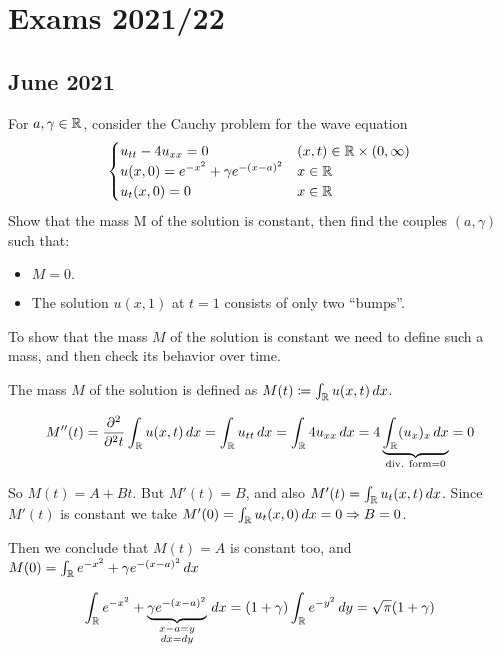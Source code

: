 \section{Exams 2021/22}
\subsection{June 2021}
\begin{exercise}
    For \(a, \gamma \in \mathbb{R}\), consider the Cauchy problem for the wave equation
    \begin{equation*}
        \begin{cases}
            u_{tt} - 4u_{xx} = 0 & (x,t) \in \mathbb{R} \times (0, \infty) \\
            u(x, 0) = e^{-x^2} + \gamma e^{-(x-a)^2} & x \in \mathbb{R} \\
            u_t(x, 0) = 0 & x \in \mathbb{R}
        \end{cases}
    \end{equation*}
    Show that the mass M of the solution is constant, then find the couples \((a, \gamma)\) such that:
    \begin{itemize}
        \item \(M = 0.\)
        \item The solution \(u(x,1)\) at \(t=1\) consists of only two ``bumps''.
    \end{itemize}
\end{exercise}

To show that the mass \(M\) of the solution is constant we need to define such a mass, and then check its behavior over time.


The mass \(M\) of the solution is defined as \(M(t) \coloneqq \int_{\mathbb{R}} u(x,t) \, dx\).

\[M''(t) = \frac{\partial^2}{\partial^2 t} \int_{\mathbb{R}} u(x,t) \, dx = \int_{\mathbb{R}} u_{tt} \, dx = \int_{\mathbb{R}} 4 u_{xx}\, dx = 4 \underbrace{\int_{\mathbb{R}} (u_x)_x\, dx}_{\text{div. form} = 0} = 0\]

So \(M(t) = A + Bt\). But \(M'(t) = B\), and also \(M'(t) = \int_{\mathbb{R}} u_t(x,t)\, dx\). Since \(M'(t)\) is constant we take \(M'(0) = \int_{\mathbb{R}} u_t(x,0)\, dx = 0 \Rightarrow B = 0\).

Then we conclude that \(M(t) = A\) is constant too, and \(M(0) = \int_{\mathbb{R}} e^{-x^2} + \gamma e^{-(x-a)^2} \, dx\)

\[
    \int_{\mathbb{R}} e^{-x^2} + \underbrace{\gamma e^{-(x-a)^2}}_{\substack{x-a=y \\ dx = dy}} \, dx = (1+ \gamma) \int_{\mathbb{R}} e^{-y^2} \, dy = \sqrt{\pi} (1 + \gamma)
\]

